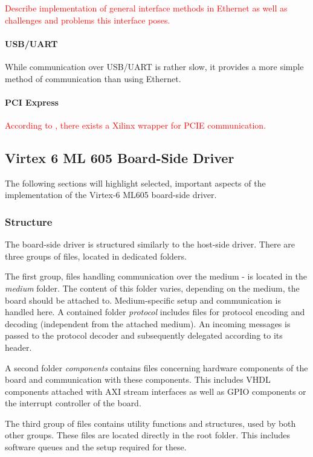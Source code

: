 \documentclass{report}
\begin{document}
\textcolor{red}{Describe implementation of general interface methods in Ethernet as well as challenges and problems this interface poses.}

\paragraph{USB/UART}
While communication over USB/UART is rather slow, it provides a more simple method of communication than using Ethernet. 

\paragraph{PCI Express}
\textcolor{red}{According to \cite{alachiotis10}, there exists a Xilinx wrapper for PCIE communication.}


\subsection{Virtex 6 ML 605 Board-Side Driver}
The following sections will highlight selected, important aspects of the implementation of the Virtex-6 ML605 board-side driver.

\subsubsection{Structure}
The board-side driver is structured similarly to the host-side driver. There are three groups of files, located in dedicated folders. 

The first group, files handling communication over the medium - is located in the \textit{medium} folder. The content of this folder varies, depending on the medium, the board should be attached to. Medium-specific setup and communication is handled here. A contained folder \textit{protocol} includes files for protocol encoding and decoding (independent from the attached medium). An incoming messages is passed to the protocol decoder and subsequently delegated according to its header.

A second folder \textit{components} contains files concerning hardware components of the board and communication with these components. This includes VHDL components attached with AXI stream interfaces as well as GPIO components or the interrupt controller of the board.

The third group of files contains utility functions and structures, used by both other groups. These files are located directly in the root folder.  This includes software queues and the setup required for these.
\end{document}
